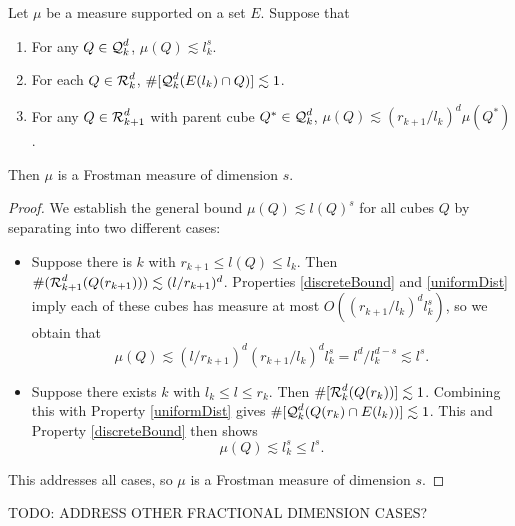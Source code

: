 \begin{lemma} \label{uniformMassFrostman}
	Let $\mu$ be a measure supported on a set $E$. Suppose that
    \begin{enumerate}
    	\item \label{discreteBound} For any $Q \in \operatorname{\mathcal{Q}}_k^d$, $\mu(Q) \lesssim l_k^s$.
    	\item \label{controlledScale} For each $Q \in \operatorname{\mathcal{R}}_k^d$, $\#[\operatorname{\mathcal{Q}}_k^d(E(l_k) \cap Q)] \lesssim 1$.
    	\item \label{uniformDist} For any $Q \in \operatorname{\mathcal{R}}_{k+1}^d$ with parent cube $Q^* \in \operatorname{\mathcal{Q}}_k^d$, $\mu(Q) \lesssim (r_{k+1}/l_k)^d \mu(Q^*)$.
    \end{enumerate}
	Then $\mu$ is a Frostman measure of dimension $s$.
\end{lemma}
\begin{proof}
	We establish the general bound $\mu(Q) \lesssim l(Q)^s$ for all cubes $Q$ by separating into two different cases:
	\begin{itemize}
		\item Suppose there is $k$ with $r_{k+1} \leq l(Q) \leq l_k$. Then $\#(\operatorname{\mathcal{R}}_{k+1}^d(Q(r_{k+1}))) \lesssim (l/r_{k+1})^d$. Properties \ref{discreteBound} and \ref{uniformDist} imply each of these cubes has measure at most $O( (r_{k+1}/l_k)^d l_k^s)$, so we obtain that
    	\[ \mu(Q) \lesssim (l/r_{k+1})^d (r_{k+1}/l_k)^d l_k^s = l^d / l_k^{d-s} \lesssim l^s. \]

    \item Suppose there exists $k$ with $l_k \leq l \leq r_k$. Then $\#[\operatorname{\mathcal{R}}_k^d(Q(r_k))] \lesssim 1$. Combining this with Property \ref{uniformDist} gives $\#[\operatorname{\mathcal{Q}}_k^d(Q(r_k) \cap E(l_k))] \lesssim 1$. This and Property \ref{discreteBound} then shows
    \[ \mu(Q) \lesssim l_k^s \leq l^s. \]
	\end{itemize}
	This addresses all cases, so $\mu$ is a Frostman measure of dimension $s$.
\end{proof}

TODO: ADDRESS OTHER FRACTIONAL DIMENSION CASES?


